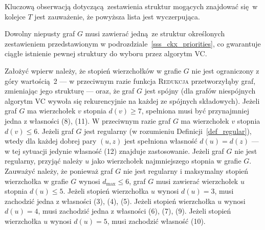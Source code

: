 {  Kluczową obserwacją dotyczącą zestawienia struktur mogących znajdować się w kolejce $T$ jest zauważenie, że powyższa lista jest wyczerpująca.
  \begin{theorem}
    Dowolny niepusty graf $G$ musi zawierać jedną ze struktur określonych zestawieniem przedstawionym w podrozdziale~\ref{sss_ckx_priorities}, co gwarantuje ciągłe istnienie pewnej struktury do wyboru przez algorytm \textsc{VC}.
  \end{theorem}
  \begin{bproof}
    Założyć wpierw należy, że stopień wierzchołków w grafie $G$ nie jest ograniczony z góry wartością 2 --- w przeciwnym razie funkcja \textsc{Redukcja} przetworzyłąby graf, zmieniając jego strukturę --- oraz, że graf $G$ jest spójny (dla grafów niespójnych algorytm \textsc{VC} wywoła się rekurencyjnie na każdej ze spójnych składowych).
    Jeżeli graf $G$ ma wierzchołek $v$ stopnia $d(v) \geq 7$, spełniona musi być przynajmniej jedna z własności (8), (11).
    W przeciwnym razie graf $G$ ma wierzchołek $v$ stopnia $d(v) \leq 6$.
    Jeżeli graf $G$ jest regularny (w rozumieniu Definicji~\ref{def_regular}), wtedy dla każdej dobrej pary $(u, z)$ jest spełniona własność $d(u)=d(z)$ --- w tej sytuacji jedynie własność (12) znajduje zastosowanie.
    Jeżeli graf $G$ nie jest regularny, przyjąć należy $u$ jako wierzchołek najmniejszego stopnia w grafie $G$.
    Zauważyć należy, że ponieważ graf $G$ nie jest regularny i maksymalny stopień wierzchołka w grafie $G$ wynosi $d_{\max} \leq 6$, graf $G$ musi zawierać wierzchołek $u$ stopnia $d(u) \leq 5$.
    Jeżeli stopień wierzchołka $u$ wynosi $d(u)=3$, musi zachodzić jedna z własności (3), (4), (5).
    Jeżeli stopień wierzchołka $u$ wynosi $d(u)=4$, musi zachodzić jedna z własności (6), (7), (9).
    Jeżeli stopień wierzchołka $u$ wynosi $d(u)=5$, musi zachodzić własność (10).
  \end{bproof}
}
